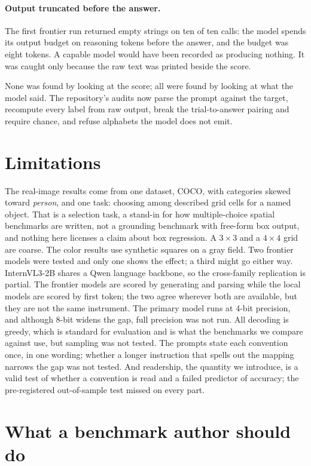 \documentclass{article}
\begin{document}
\paragraph{Output truncated before the answer.} The first frontier run returned
empty strings on ten of ten calls: the model spends its output budget on
reasoning tokens before the answer, and the budget was eight tokens. A capable
model would have been recorded as producing nothing. It was caught only because
the raw text was printed beside the score.

None was found by looking at the score; all were found by looking at what the
model said. The repository's audits now parse the prompt against the target,
recompute every label from raw output, break the trial-to-answer pairing and
require chance, and refuse alphabets the model does not emit.

\section{Limitations}

The real-image results come from one dataset, COCO, with categories skewed toward
\emph{person}, and one task: choosing among described grid cells for a named
object. That is a selection task, a stand-in for how multiple-choice spatial
benchmarks are written, not a grounding benchmark with free-form box output, and
nothing here licenses a claim about box regression. A $3\times3$ and a
$4\times4$ grid are coarse. The color results use
synthetic squares on a gray field. Two frontier models were tested and only one
shows the effect; a third might go either way. InternVL3-2B shares a Qwen language
backbone, so the cross-family replication is partial. The frontier models are
scored by generating and parsing while the local models are scored by first
token; the two agree wherever both are available, but they are not the same
instrument. The primary model runs at 4-bit precision, and although 8-bit widens
the gap, full precision was not run. All decoding is greedy, which is standard for
evaluation and is what the benchmarks we compare against use, but sampling was
not tested. The prompts state each convention once, in one wording; whether a
longer instruction that spells out the mapping narrows the gap was not tested. And readership, the quantity we
introduce, is a valid test of whether a convention is read and a failed predictor
of accuracy; the pre-registered out-of-sample test missed on every part.

\section{What a benchmark author should do}
\end{document}
